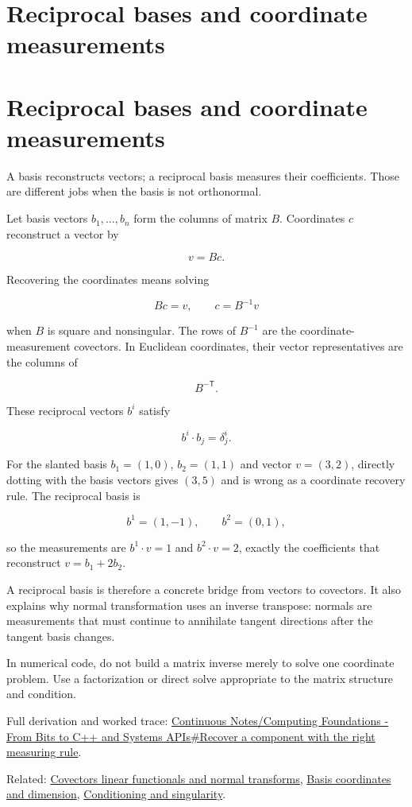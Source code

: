 \hypertarget{appendix-6b3d696dd902}{}
\section*{Reciprocal bases and coordinate measurements}
\section{Reciprocal bases and coordinate measurements}\label{reciprocal-bases-and-coordinate-measurements}

A basis reconstructs vectors; a reciprocal basis measures their coefficients. Those are different jobs when the basis is not orthonormal.

Let basis vectors \(b_1,\ldots,b_n\) form the columns of matrix \(B\). Coordinates \(c\) reconstruct a vector by

\[
v=Bc.
\]

Recovering the coordinates means solving

\[
Bc=v,
\qquad c=B^{-1}v
\]

when \(B\) is square and nonsingular. The rows of \(B^{-1}\) are the coordinate-measurement covectors. In Euclidean coordinates, their vector representatives are the columns of

\[
B^{-\mathsf T}.
\]

These reciprocal vectors \(b^i\) satisfy

\[
b^i\cdot b_j=\delta^i_j.
\]

For the slanted basis \(b_1=(1,0)\), \(b_2=(1,1)\) and vector \(v=(3,2)\), directly dotting with the basis vectors gives \((3,5)\) and is wrong as a coordinate recovery rule. The reciprocal basis is

\[
b^1=(1,-1),\qquad b^2=(0,1),
\]

so the measurements are \(b^1\cdot v=1\) and \(b^2\cdot v=2\), exactly the coefficients that reconstruct \(v=b_1+2b_2\).

A reciprocal basis is therefore a concrete bridge from vectors to covectors. It also explains why normal transformation uses an inverse transpose: normals are measurements that must continue to annihilate tangent directions after the tangent basis changes.

In numerical code, do not build a matrix inverse merely to solve one coordinate problem. Use a factorization or direct solve appropriate to the matrix structure and condition.

Full derivation and worked trace: \href{Continuous\%20Notes/Computing\%20Foundations\%20-\%20From\%20Bits\%20to\%20C++\%20and\%20Systems\%20APIs\#Recover\%20a\%20component\%20with\%20the\%20right\%20measuring\%20rule}{Continuous Notes/Computing Foundations - From Bits to C++ and Systems APIs\#Recover a component with the right measuring rule}.

Related: \hyperref[appendix-46da295c6787]{Covectors linear functionals and normal transforms}, \hyperref[appendix-ce0341f7ea0d]{Basis coordinates and dimension}, \hyperref[appendix-8f6a01f284a7]{Conditioning and singularity}.
